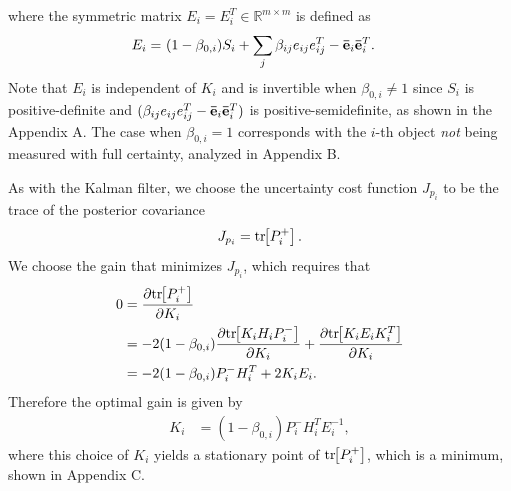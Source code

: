\documentclass[letterpaper, paper,10pt]{AAS}		%
\newcommand{\bracket}[1]{\ensuremath{\left[ #1 \right]}}
\newcommand{\refeqn}[1]{(\ref{eqn:#1})}
\newcommand{\tr}[1]{\mathrm{tr}\ensuremath{\negthickspace\bracket{#1}}}
\renewcommand{\Re}{\ensuremath{\mathbb{R}}}
\begin{document}
where the symmetric matrix $E_i=E_i^T\in\Re^{m\times m}$ is defined as
\begin{align}
E_i=&\ (1-\beta_{0,i})S_i+{\sum\limits_{j} \beta_{ij}e_{ij}e_{ij}^T-{\bf\bar{e}}_{i}}{\bf\bar{e}}_{i}^T.\label{eqn:E}
\end{align}
Note that $E_i$ is independent of $K_i$ and is invertible when $\beta_{0,i}\neq1$ since $S_i$ is positive-definite and
$(\beta_{ij}e_{ij}e_{ij}^T-{\bf\bar{e}}_{i}{\bf\bar{e}}_{i}^T)$ is positive-semidefinite, as shown in the Appendix A. 
The case when $\beta_{0,i}=1$ corresponds with the $i$-th object \emph{not} being measured with full certainty, analyzed in Appendix B.

As with the Kalman filter, we choose the uncertainty cost function $J_{p_i}$ to be the trace of the posterior covariance
\begin{align}
\label{eqn:JpIntro}
J_{p_i}=\tr{P_i^+}.
\end{align}
We choose the gain that minimizes $J_{p_i}$, which requires that
\begin{align}
0&=\frac{\partial\tr{P^+_i}}{\partial K_i}\nonumber
\\
&=-2(1-\beta_{0,i})\frac{\partial\tr{K_iH_iP^-_i}}{\partial K_i}+\frac{\partial\tr{K_iE_iK_i^T}}{\partial K_i}\nonumber%
\\
&=-2(1-\beta_{0,i})P^-_iH_i^T+2K_iE_i.\label{eqn:Uncertainty0}
\end{align}
Therefore the optimal gain is given by
\begin{align}
K_i&=(1-\beta_{0,i})P^-_iH_i^TE_i^{-1},\label{eqn:GainK}
\end{align}
where this choice of $K_i$ yields a stationary point of $\tr{P_i^+}$, which is a minimum, shown in Appendix C.
\end{document}
